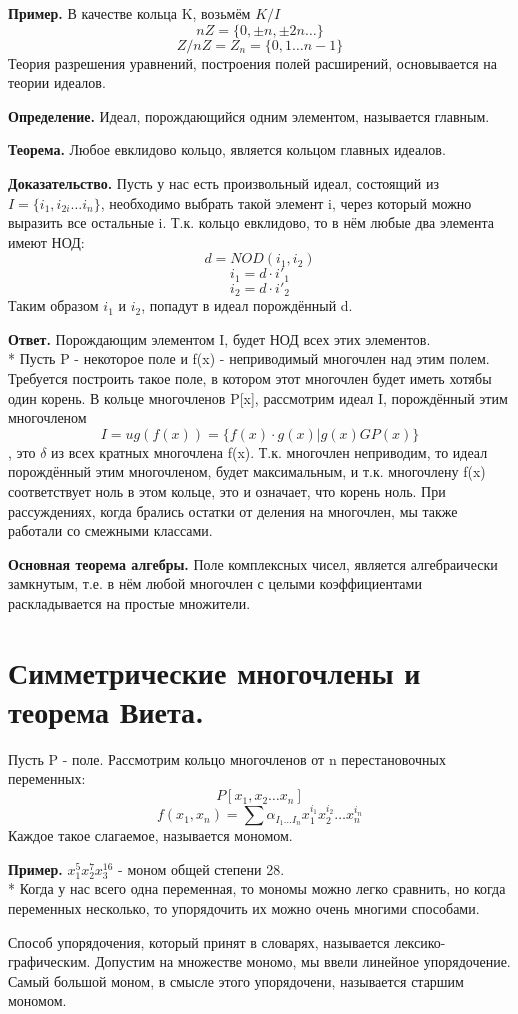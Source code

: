 \documentclass{article}
\begin{document}
{\bf Пример.} В качестве кольца K, возьмём $K/I$ $$nZ=\{0,\pm n,\pm 2n\ldots\}$$
$$Z/nZ=Z_n=\{0,1\ldots n-1\}$$
Теория  разрешения уравнений, построения полей расширений, основывается на теории идеалов.

{\bf Определение.} Идеал, порождающийся одним элементом, называется главным.

{\bf Теорема.} Любое евклидово кольцо, является кольцом главных идеалов.

{\bf Доказательство.} Пусть у нас есть произвольный идеал, состоящий из $I=\{i_1,i_{2i}\ldots i_n\}$, необходимо  выбрать такой элемент i, через который можно выразить все остальные i. Т.к. кольцо евклидово, то в нём любые два элемента имеют НОД: $$d=NOD(i_1,i_2)$$
$$i_1=d\cdot i'_1$$
$$i_2=d\cdot i'_2$$
Таким образом $i_1$ и $i_2$, попадут в идеал порождённый d.

{\bf Ответ.} Порождающим элементом I, будет НОД всех этих элементов.\\*
Пусть P - некоторое поле и f(x) - неприводимый многочлен над этим полем. Требуется построить такое поле, в котором этот многочлен будет иметь хотябы один корень. В кольце многочленов P[x], рассмотрим идеал I, порождённый этим многочленом $$I=ug(f(x))=\{f(x)\cdot g(x)| g(x)GP(x)\}$$, это $\delta$ из всех кратных многочлена f(x). Т.к. многочлен неприводим, то идеал порождённый этим многочленом, будет максимальным, и т.к. многочлену f(x) соответствует ноль в этом кольце, это и означает, что корень ноль. При рассуждениях, когда брались остатки от деления на многочлен, мы также работали со смежными классами.

{\bf Основная теорема алгебры.} Поле комплексных чисел, является алгебраически замкнутым, т.е. в нём любой многочлен с целыми коэффициентами раскладывается на простые множители.
\section*{Симметрические многочлены и теорема Виета.}
Пусть P - поле. Рассмотрим кольцо многочленов от n перестановочных переменных: $$P[x_1,x_2\ldots x_n]$$
$$f(x_1,x_n)=\sum\alpha_{I_1\ldots I_n}x^{i_1}_1x^{i_2}_2\ldots x^{i_n}_n$$
Каждое такое слагаемое, называется мономом.

{\bf Пример.} $x^5_1x^7_2x^{16}_3$ - моном общей степени 28.\\*
Когда у нас всего одна переменная, то мономы можно легко сравнить, но когда переменных несколько, то упорядочить их можно очень многими способами.

Способ упорядочения, который принят в словарях, называется лексико-графическим. Допустим на множестве мономо, мы ввели линейное упорядочение. Самый большой моном, в смысле этого упорядочени, называется старшим мономом.
\end{document}
